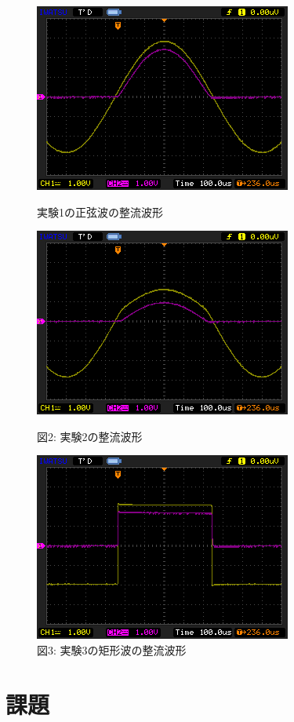 \documentclass[titlepage,a4paper,11pt]{jsarticle}
\begin{document}
  \begin{figure}[htbp]
    \begin{center}
      \includegraphics{./img/Copy_0.png}
      \caption{実験1の正弦波の整流波形}
      \includegraphics{./img/Copy_1.png}
      \caption{図2: 実験2の整流波形}
      \includegraphics{./img/Copy_2.png}
      \caption{図3: 実験3の矩形波の整流波形}
    \end{center}
  \end{figure}

\newpage

\section{課題}
\end{document}

